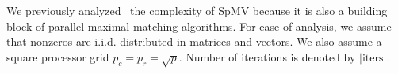 We previously analyzed~\cite{azad2016distributed} the complexity of SpMV because it is also a building block of parallel maximal matching algorithms.
For ease of analysis, we assume that nonzeros are i.i.d. distributed in matrices and vectors. %
We also assume a square processor grid $p_c{=}p_r{=}\sqrt{p}$. Number of iterations is denoted by $\left\vert{\mathrm{iters}} \right\vert$.

 






